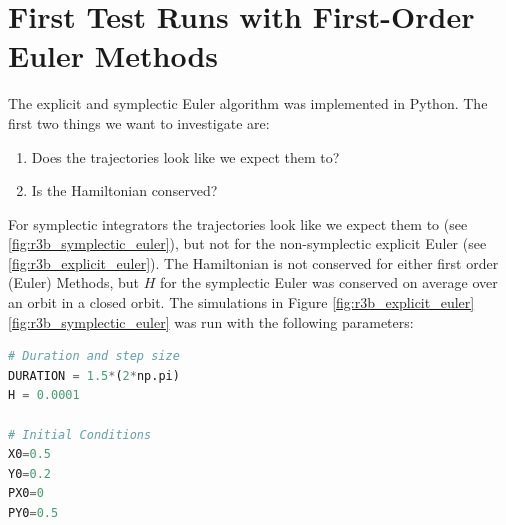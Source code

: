 \section{First Test Runs with First-Order Euler Methods}
The explicit and symplectic Euler algorithm was implemented in Python. The first two things we want to investigate are:
\begin{enumerate}
    \item Does the trajectories look like we expect them to? 
    \item Is the Hamiltonian conserved?
\end{enumerate}
For symplectic integrators the trajectories look like we expect them to (see \ref{fig:r3b_symplectic_euler}), but not for the non-symplectic explicit Euler (see \ref{fig:r3b_explicit_euler}). The Hamiltonian is not conserved for either first order (Euler) Methods, but $H$ for the symplectic Euler was conserved on average over an orbit in a closed orbit.
The simulations in Figure \ref{fig:r3b_explicit_euler} \ref{fig:r3b_symplectic_euler} was run with the following parameters:
\begin{adjustwidth*}{0cm}{-0.4cm}
\begin{lstlisting}[language=Python,caption={Initial conditions, step size and duration for initial test run},label={lst:testrun}]
# Duration and step size
DURATION = 1.5*(2*np.pi)
H = 0.0001

# Initial Conditions
X0=0.5
Y0=0.2
PX0=0
PY0=0.5
\end{lstlisting}
\end{adjustwidth*}

